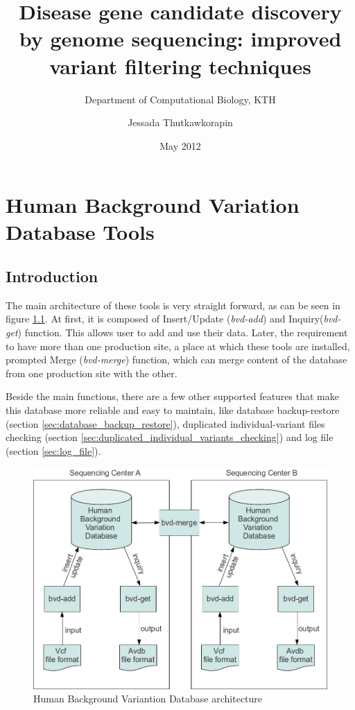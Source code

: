 \documentclass[a4paper,11pt]{kth-mag}
\title{Disease gene candidate discovery by genome sequencing: 
improved variant filtering techniques}
\subtitle{Department of Computational Biology, KTH}
\author{Jessada Thutkawkorapin}
\date{May 2012}
\begin{document}
\frontmatter
\pagestyle{empty}
\removepagenumbers
{}

\tableofcontents*
\mainmatter
\pagestyle{newchap}










\chapter{Human Background Variation Database Tools}
\section{Introduction}
The main architecture of these tools is very straight forward, as can be seen in figure \ref{fig:hbvdb_architecture}. At first, it is composed of Insert/Update (\emph{bvd-add}) and Inquiry(\emph{bvd-get}) function. This allows user to add and use their data. Later, the requirement to have more than one production site, a place at which these tools are installed, prompted Merge (\emph{bvd-merge}) function, which can merge content of the database from one production site with the other.

Beside the main functions, there are a few other supported features that make this database more reliable and easy to maintain, like database backup-restore (section \ref{sec:database_backup_restore}), duplicated individual-variant files checking (section \ref{sec:duplicated_individual_variants_checking}) and log file (section \ref{sec:log_file}).

\begin{figure}[htp]
\centering
\includegraphics[scale=0.57]{fig_hbvdb_architecture.png}
\caption{Human Background Variantion Database architecture}
\label{fig:hbvdb_architecture}
\end{figure}
\end{document}
